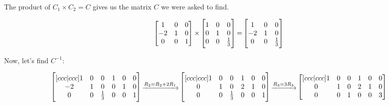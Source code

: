 \documentclass[11pt]{article}
\begin{document}
The product of $C_1 \times C_2 = C$ gives us the matrix $C$ we were asked to
find.

\begin{equation*}
  \begin{bmatrix}
    1 & 0 & 0 \\
    -2 & 1 & 0 \\
    0 & 0 & 1 \\
  \end{bmatrix}
  \begin{aligned} \times \end{aligned}
  \begin{bmatrix}
    1 & 0 & 0 \\
    0 & 1 & 0 \\
    0 & 0 & {1\over 3} \\
  \end{bmatrix}
  \begin{aligned} = \end{aligned}
  \begin{bmatrix}
    1 & 0 & 0 \\
    -2 & 1 & 0 \\
    0 & 0 & {1\over 3} \\
  \end{bmatrix}
\end{equation*}

Now, let's find $C^{-1}$:

\begin{equation*}
  \begin{bmatrix}[ccc|ccc]
    1  & 0 & 0          & 1 & 0 & 0 \\
    -2 & 1 & 0          & 0 & 1 & 0 \\
    0  & 0 & {1\over 3} & 0 & 0 & 1 \\
  \end{bmatrix}
  \begin{aligned} \xrightarrow{R_2 = R_2 + 2R_1} \end{aligned}
  \begin{bmatrix}[ccc|ccc]
    1 & 0 & 0          & 1 & 0 & 0 \\
    0 & 1 & 0          & 2 & 1 & 0 \\
    0 & 0 & {1\over 3} & 0 & 0 & 1 \\
  \end{bmatrix}
  \begin{aligned} \xrightarrow{R_3 = 3R_3} \end{aligned}
  \begin{bmatrix}[ccc|ccc]
    1 & 0 & 0 & 1 & 0 & 0 \\
    0 & 1 & 0 & 2 & 1 & 0 \\
    0 & 0 & 1 & 0 & 0 & 3 \\
  \end{bmatrix}
\end{equation*}
\end{document}
